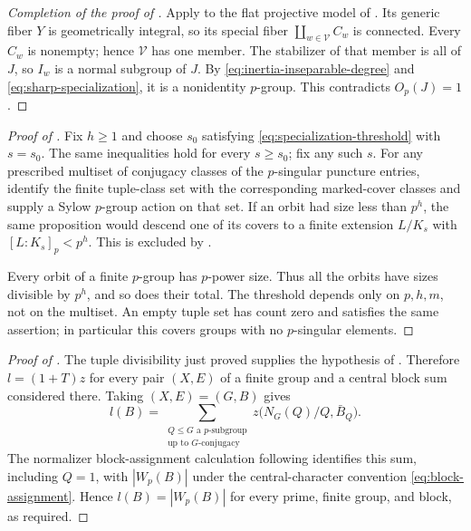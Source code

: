 \begin{proof}[Completion of the proof of ]
Apply  to the flat projective
model of . Its generic fiber $Y$ is
geometrically integral, so its special fiber
$\coprod_{w\in\mathcal V}C_w$ is connected. Every $C_w$ is nonempty;
hence $\mathcal V$ has one member. The stabilizer of that member is
all of $J$, so $I_w$ is a normal subgroup of $J$. By
\eqref{eq:inertia-inseparable-degree} and
\eqref{eq:sharp-specialization}, it is a nonidentity $p$-group.
This contradicts $O_p(J)=1$.
\end{proof}

\begin{proof}[Proof of ]
Fix $h\geq1$ and choose $s_0$ satisfying
\eqref{eq:specialization-threshold} with $s=s_0$.
The same inequalities hold for every $s\geq s_0$; fix any such $s$.
For any prescribed multiset of
conjugacy classes of the $p$-singular puncture entries,
identify the finite tuple-class set with the corresponding marked-cover
classes and supply a Sylow
$p$-group action on that set. If an orbit had size less than $p^h$,
the same proposition would descend one of its covers to a finite
extension $L/K_s$ with $[L:K_s]_p<p^h$. This is excluded by
.

Every orbit of a finite $p$-group has $p$-power size. Thus all the
orbits have sizes divisible by $p^h$, and so does their total.
The threshold depends only on $p,h,m$, not on the multiset.
An empty tuple set has count zero and satisfies the same assertion;
in particular this covers groups with no $p$-singular elements.
\end{proof}

\begin{proof}[Proof of ]
The tuple divisibility just proved supplies the hypothesis of
. Therefore $l=(1+T)z$ for every pair
$(X,E)$ of a finite group and a central block sum considered there.
Taking $(X,E)=(G,B)$ gives
\[
 l(B)=
 \sum_{\substack{Q\leq G\text{ a }p\text{-subgroup}\\
                   \text{up to }G\text{-conjugacy}}}
 z\bigl(N_G(Q)/Q,\bar B_Q\bigr).
\]
The normalizer block-assignment calculation following
 identifies this sum, including $Q=1$,
with $|W_p(B)|$ under the central-character convention
\eqref{eq:block-assignment}. Hence $l(B)=|W_p(B)|$ for every prime,
finite group, and block, as required.
\end{proof}

